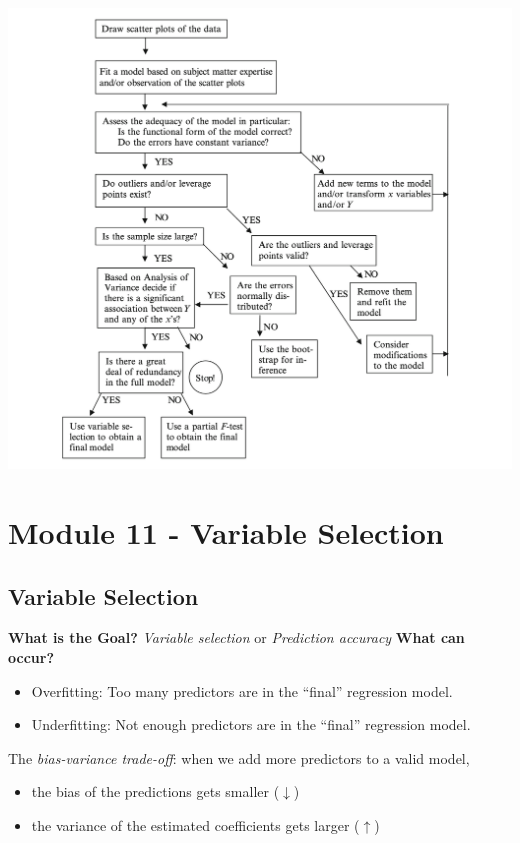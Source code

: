 \documentclass[11pt]{article}
\theoremstyle{definition}
\numberwithin{equation}{section}
\begin{document}
  \includegraphics[width=\textwidth]{./images/data-analysis-flow}

\newpage

\section{Module 11 - Variable Selection}

\subsection{Variable Selection}

\textbf{What is the Goal?} \textit{Variable selection} or \textit{Prediction accuracy}
\textbf{What can occur?}
\begin{itemize}
  \item Overfitting: Too many predictors are in the ``final'' regression model.
  \item Underfitting: Not enough predictors are in the ``final'' regression model.
\end{itemize}
The \textit{bias-variance trade-off}: when we add more predictors to a valid model,
\begin{itemize}
  \item the bias of the predictions gets smaller ($\downarrow$)
  \item the variance of the estimated coefficients gets larger ($\uparrow$)
\end{itemize}
\end{document}
